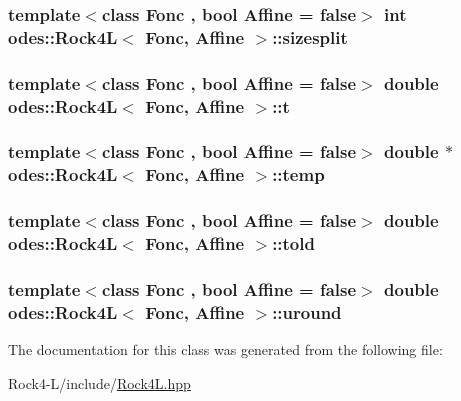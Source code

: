 \hypertarget{classodes_1_1Rock4L_a56f3f8c8114fec4136559e1be7fe54a7}{
\subsubsection[{sizesplit}]{\setlength{\rightskip}{0pt plus 5cm}template$<$class Fonc , bool Affine = false$>$ int {\bf odes\-::\-Rock4\-L}$<$ Fonc, Affine $>$\-::sizesplit\hspace{0.3cm}{\ttfamily [private]}}}\label{classodes_1_1Rock4L_a56f3f8c8114fec4136559e1be7fe54a7}
\hypertarget{classodes_1_1Rock4L_a856ed411947dd6a6162c822618dccd99}{
\subsubsection[{t}]{\setlength{\rightskip}{0pt plus 5cm}template$<$class Fonc , bool Affine = false$>$ double {\bf odes\-::\-Rock4\-L}$<$ Fonc, Affine $>$\-::t\hspace{0.3cm}{\ttfamily [private]}}}\label{classodes_1_1Rock4L_a856ed411947dd6a6162c822618dccd99}
\hypertarget{classodes_1_1Rock4L_acd73674b60301f945cb5f2d3e45ffbb9}{
\subsubsection[{temp}]{\setlength{\rightskip}{0pt plus 5cm}template$<$class Fonc , bool Affine = false$>$ double $\ast$ {\bf odes\-::\-Rock4\-L}$<$ Fonc, Affine $>$\-::temp\hspace{0.3cm}{\ttfamily [private]}}}\label{classodes_1_1Rock4L_acd73674b60301f945cb5f2d3e45ffbb9}
\hypertarget{classodes_1_1Rock4L_a7991102ddcd6abc28c1e432774acc0cd}{
\subsubsection[{told}]{\setlength{\rightskip}{0pt plus 5cm}template$<$class Fonc , bool Affine = false$>$ double {\bf odes\-::\-Rock4\-L}$<$ Fonc, Affine $>$\-::told\hspace{0.3cm}{\ttfamily [private]}}}\label{classodes_1_1Rock4L_a7991102ddcd6abc28c1e432774acc0cd}
\hypertarget{classodes_1_1Rock4L_a8d7ea8a9a5554e5f5e7dc323dc5f4060}{
\subsubsection[{uround}]{\setlength{\rightskip}{0pt plus 5cm}template$<$class Fonc , bool Affine = false$>$ double {\bf odes\-::\-Rock4\-L}$<$ Fonc, Affine $>$\-::uround\hspace{0.3cm}{\ttfamily [private]}}}\label{classodes_1_1Rock4L_a8d7ea8a9a5554e5f5e7dc323dc5f4060}


The documentation for this class was generated from the following file\-:\begin{DoxyCompactItemize}
\item 
Rock4-\/\-L/include/\hyperlink{Rock4L_8hpp}{Rock4\-L.\-hpp}\end{DoxyCompactItemize}
